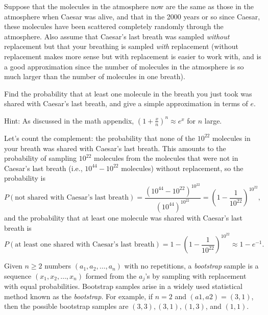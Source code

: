 {    Suppose that the molecules in the atmosphere now are the same as those in the atmosphere when Caesar was alive, and that in the 2000 years or so since Caesar, these molecules have been scattered completely randomly through the atmosphere. 
    Also assume that Caesar's last breath was sampled \textit{without} replacement but that your breathing is sampled \textit{with} replacement (without replacement makes more sense but with replacement is easier to work with, and is a good approximation since the number of molecules in the atmosphere is so much larger than the number of molecules in one breath). 

    Find the probability that at least one molecule in the breath you just took was shared with Caesar's last breath, and give a simple approximation in terms of $e$. 

    Hint: As discussed in the math appendix, $\left( 1 + \frac{x}{n} \right)^n \approx e^x$ for $n$ large. 
    \begin{solution}
        Let's count the complement: the probability that none of the $10^{22}$ molecules in your breath was shared with Caesar's last breath. 
        This amounts to the probability of sampling $10^{22}$ molecules from the molecules that were not in Caesar's last breath (i.e., $10^{44} - 10^{22}$ molecules) without replacement, so the probability is 
        \begin{equation*}
            P(\text{not shared with Caesar's last breath}) = \frac{(10^{44} - 10^{22})^{10^{22}}}{(10^{44})^{10^{22}}} = \left( 1 - \frac{1}{10^{22}} \right)^{10^{22}}, 
        \end{equation*}
        and the probability that at least one molecule was shared with Caesar's last breath is 
        \begin{equation*}
            P(\text{at least one shared with Caesar's last breath}) = 1 - \left( 1 - \frac{1}{10^{22}} \right)^{10^{22}} \approx 1 - e^{-1}. 
        \end{equation*}
    \end{solution}
    \item%
    \item%
    \item%
    Given $n \geq 2$ numbers $(a_1, a_2, \dots, a_n)$ with no repetitions, a \textit{bootstrap} sample is a sequence $(x_1, x_2, \dots, x_n)$ formed from the $a_j$'s by sampling with replacement with equal probabilities. 
    Bootstrap samples arise in a widely used statistical method known as the \textit{bootstrap}. 
    For example, if $n = 2$ and $(a1, a2) = (3, 1)$, then the possible bootstrap samples are $(3, 3), (3, 1), (1, 3)$, and $(1, 1)$. 
}
